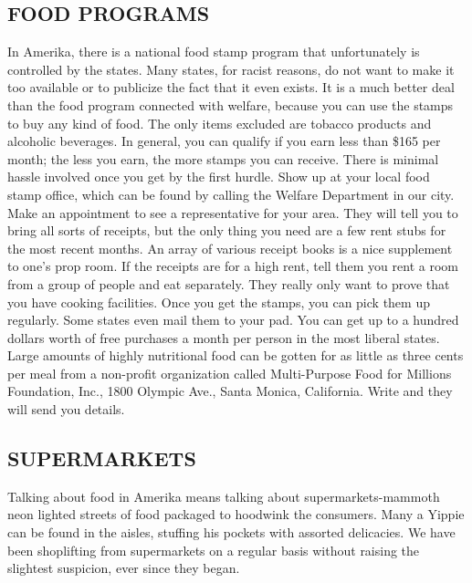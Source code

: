 \documentclass[11pt,twoside,a4paper]{book}
\begin{document}
\clearpage

\subsection{FOOD PROGRAMS}

In Amerika, there is a national food stamp program that unfortunately is controlled by the states. Many states, for racist reasons, do not want to make it too available or to publicize the fact that it even exists. It is a much better deal than the food program connected with welfare, because you can use the stamps to buy any kind of food. The only items excluded are tobacco products and alcoholic beverages. In general, you can qualify if you earn less than \$165 per month; the less you earn, the more stamps you can receive. There is minimal hassle involved once you get by the first hurdle. Show up at your local food stamp office, which can be found by calling the Welfare Department in our city. Make an appointment to see a representative for your area. They will tell you to bring all sorts of receipts, but the only thing you need are a few rent stubs for the most recent months. An array of various receipt books is a nice supplement to one's prop room. If the receipts are for a high rent, tell them you rent a room from a group of people and eat separately. They really only want to prove that you have cooking facilities. Once you get the stamps, you can pick them up regularly. Some states even mail them to your pad. You can get up to a hundred dollars worth of free purchases a month per person in the most liberal states.~\\

Large amounts of highly nutritional food can be gotten for as little as three cents per meal from a non-profit organization called Multi-Purpose Food for Millions Foundation, Inc., 1800 Olympic Ave., Santa Monica, California. Write and they will send you details.

\subsection{SUPERMARKETS}

Talking about food in Amerika means talking about supermarkets-mammoth neon lighted streets of food packaged to hoodwink the consumers. Many a Yippie can be found in the aisles, stuffing his pockets with assorted delicacies. We have been shoplifting from supermarkets on a regular basis without raising the slightest suspicion, ever since they began.~\\
\end{document}
